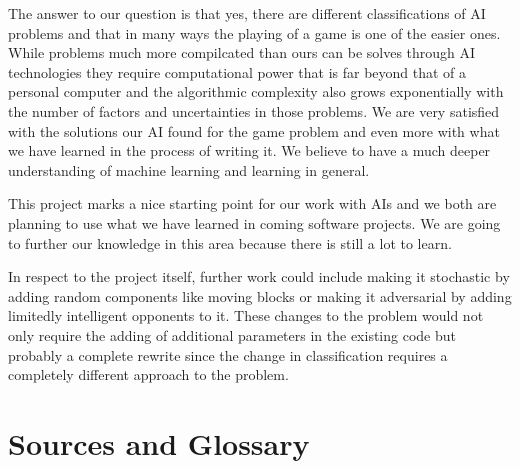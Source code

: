 The answer to our question is that yes, there are different classifications of AI problems and that in many ways the playing of a game is one of the easier ones. While problems much more compilcated than ours can be solves through AI technologies they require computational power that is far beyond that of a personal computer and the algorithmic complexity also grows exponentially with the number of factors and uncertainties in those problems. We are very satisfied with the solutions our AI found for the game problem and even more with what we have learned in the process of writing it. We believe to have a much deeper understanding of machine learning and learning in general.

This project marks a nice starting point for our work with AIs and we both are planning to use what we have learned in coming software projects. We are going to further our knowledge in this area because there is still a lot to learn.

In respect to the project itself, further work could include making it stochastic by adding random components like moving blocks or making it adversarial by adding limitedly intelligent opponents to it. These changes to the problem would not only require the adding of additional parameters in the existing code but probably a complete rewrite since the change in classification requires a completely different approach to the problem.

\onecolumn
\chapter{Sources and Glossary}


